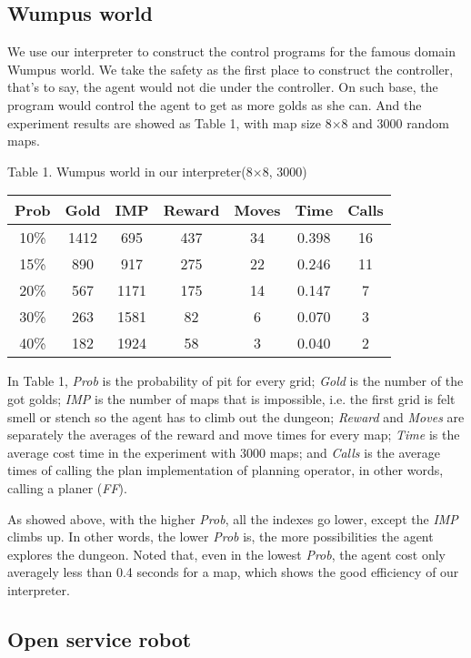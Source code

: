 \documentclass[letterpaper]{article}
\begin{document}
\subsection{Wumpus world}

We use our interpreter to construct the control programs for the famous domain Wumpus world. We take the safety as the first place to construct the controller, that's to say, the agent would not die under the controller. On such base, the program would control the agent to get as more golds as she can. And the experiment results are showed as Table 1, with map size 8$\times$8 and 3000 random maps.

\small\noindent
\begin{center}
Table 1. Wumpus world in our interpreter(8$\times$8, 3000)
\begin{tabular}{|c|c|c|c|c|c|c|}
\hline
Prob & Gold & IMP & Reward & Moves & Time & Calls \\
\hline
10\% & 1412 & 695 & 437 & 34 & 0.398 & 16 \\
\hline
15\% & 890 & 917 & 275 & 22 & 0.246 & 11 \\
\hline
20\% & 567 & 1171 & 175 & 14 & 0.147 & 7 \\
\hline
30\% & 263 & 1581 & 82 & 6 & 0.070 & 3 \\
\hline
40\% & 182 & 1924 & 58 & 3 & 0.040 & 2 \\
\hline
\end{tabular}
\end{center}
\normalsize

In Table 1, \emph{Prob} is the probability of pit for every grid; \emph{Gold} is the number of the got golds; \emph{IMP} is the number of maps that is impossible, i.e. the first grid is felt smell or stench so the agent has to climb out the dungeon; \emph{Reward} and \emph{Moves} are separately the averages of the reward and move times for every map; \emph{Time} is the average cost time in the experiment with 3000 maps; and \emph{Calls} is the average times of calling the plan implementation of planning operator, in other words, calling a planer (\emph{FF}).

As showed above, with the higher \emph{Prob}, all the indexes go lower, except the \emph{IMP} climbs up. In other words, the lower \emph{Prob} is, the more possibilities the agent explores the dungeon. Noted that, even in the lowest \emph{Prob}, the agent cost only averagely less than 0.4 seconds for a map, which shows the good efficiency of our interpreter.

\subsection{Open service robot}
\end{document}
